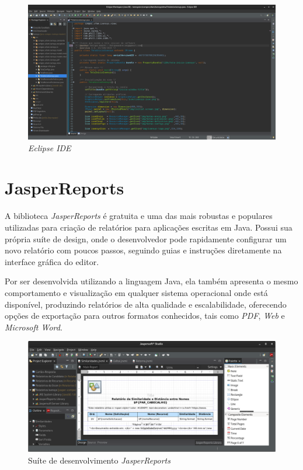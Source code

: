 \documentclass[
	12pt,			%
	openright,		%
	oneside,	
	a4paper,		%
	english,		%
	brazil			%
]{abntex2/abntex2}  %
\begin{document}
			\begin{figure}[ht]
				\begin{center}
					
					\caption{\textit{Eclipse IDE}}
					\includegraphics[scale=0.2]{img/eclipse-ide}
					
				\end{center}
			\end{figure}
		
		\section{JasperReports\textregistered}
		
			A biblioteca \textit{JasperReports\textregistered} \cite{jasper} é gratuita e uma das mais robustas e populares utilizadas para criação de relatórios para aplicações escritas em Java. Possui sua própria suíte de design, onde o desenvolvedor pode rapidamente configurar um novo relatório com poucos passos, seguindo guias e instruções diretamente na interface gráfica do editor.
			
			Por ser desenvolvida utilizando a linguagem Java, ela também apresenta o mesmo comportamento e visualização em qualquer sistema operacional onde está disponível, produzindo relatórios de alta qualidade e escalabilidade, oferecendo opções de exportação para outros formatos conhecidos, tais como \textit{PDF}, \textit{Web} e \textit{Microsoft Word}.
			
			\begin{figure}[ht]
				\begin{center}
				
				\caption{Suíte de desenvolvimento \textit{JasperReports\textregistered}}
				\includegraphics[scale=0.35]{img/jaspersoft}
				
				\end{center}
			\end{figure}
			
\end{document}
